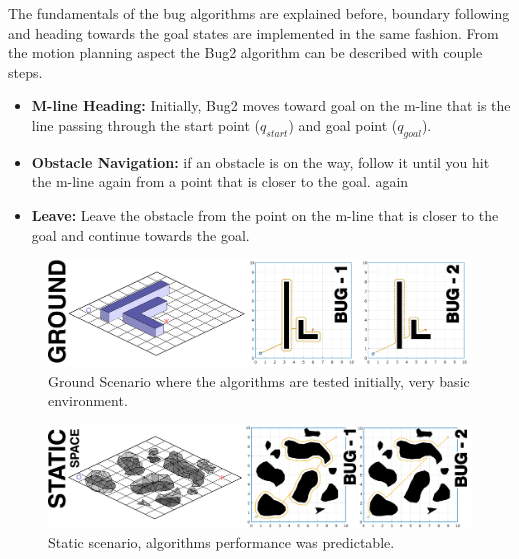 \documentclass{IEEEtaes}
\begin{document}
The fundamentals of the bug algorithms are explained before, boundary following and heading towards the goal states are implemented in the same fashion. From the motion planning aspect the Bug2 algorithm can be described with couple steps.

\begin{itemize}
\item
  \textbf{M-line Heading:} Initially, Bug2 moves toward goal on the m-line that is the line passing through the start point ($q_{start}$) and goal point ($q_{goal}$).
\item
  \textbf{Obstacle Navigation:} if an obstacle is on the way, follow it until you hit the m-line again from a point that is closer to the goal. 
again
\item
  \textbf{Leave:} Leave the obstacle from the point on the m-line that is closer to the goal and continue towards the goal.
\end{itemize}

\begin{figure}[t!]
    \begin{center}
        \includegraphics[width=0.99\linewidth]{figures/GROUND.pdf}
     \end{center}
     \caption{Ground Scenario where the algorithms are tested initially, very basic environment.}
     \label{ground}
\end{figure}

\begin{figure}[b!]
    \begin{center}
        \includegraphics[width=1.0\linewidth]{figures/STATIC-1.pdf}
     \end{center}
     \caption{Static scenario, algorithms performance was predictable.}
     \label{static}
\end{figure}
\end{document}
